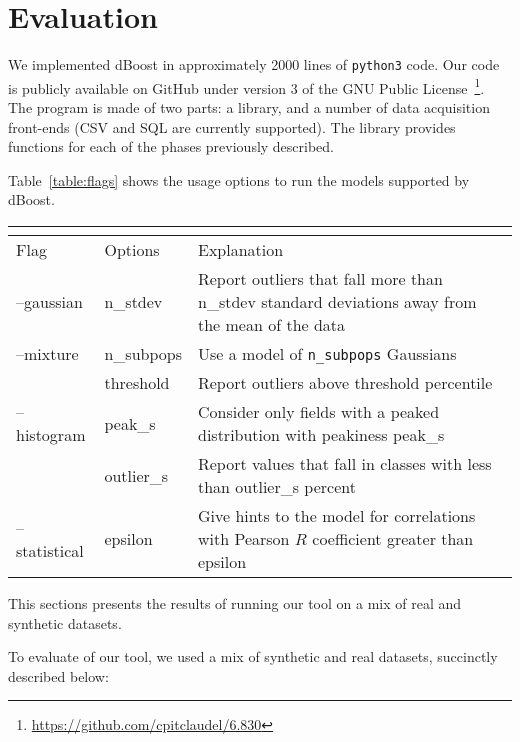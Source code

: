 \section{Evaluation}
\label{sec:evaluation}

We implemented dBoost in approximately 2000 lines of \texttt{python3} code. Our code is publicly available on GitHub under version 3 of the GNU Public License~\footnote{\url{https://github.com/cpitclaudel/6.830}}. The program is made of two parts: a library, and a number of data acquisition front-ends (CSV and SQL are currently supported). The library provides functions for each of the phases previously described.

Table~\ref{table:flags} shows the usage options to run the models supported by dBoost. 

\begin{table*}
  \renewcommand{\arraystretch}{1.2}
  \setlength\tabcolsep{3\tabcolsep}

  \label{table:flags}
  \caption{dBoost command line usage.}
  \centering
  \begin{tabular} { l | l | p{10cm} }
    \multicolumn{3}{l}{} \\
    \hline
    Flag & Options & Explanation \\
    \hline
    --gaussian & n\_stdev & Report outliers that fall more than n\_stdev standard deviations away from the mean of the data \\
    --mixture & n\_subpops & Use a model of \texttt{n\_subpops} Gaussians \\
         & threshold & Report outliers above threshold percentile \\
    --histogram & peak\_s & Consider only fields with a peaked distribution with peakiness peak\_s \\
         & outlier\_s & Report values that fall in classes with less than outlier\_s percent \\
    --statistical & epsilon & Give hints to the model for correlations with Pearson $R$ coefficient greater than epsilon \\
  \end{tabular}
\end{table*}

This sections presents the results of running our tool on a mix of real and synthetic datasets.

To evaluate of our tool, we used a mix of synthetic and real datasets, succinctly described below:

